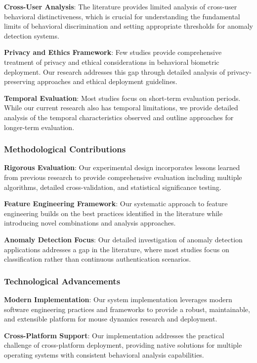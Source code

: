 \documentclass[
  12pt,
  a4paper,
]{report}
\begin{document}
\textbf{Cross-User Analysis}: The literature provides limited analysis
of cross-user behavioral distinctiveness, which is crucial for
understanding the fundamental limits of behavioral discrimination and
setting appropriate thresholds for anomaly detection systems.

\textbf{Privacy and Ethics Framework}: Few studies provide comprehensive
treatment of privacy and ethical considerations in behavioral biometric
deployment. Our research addresses this gap through detailed analysis of
privacy-preserving approaches and ethical deployment guidelines.

\textbf{Temporal Evaluation}: Most studies focus on short-term
evaluation periods. While our current research also has temporal
limitations, we provide detailed analysis of the temporal
characteristics observed and outline approaches for longer-term
evaluation.

\subsubsection{Methodological
Contributions}\label{methodological-contributions}

\textbf{Rigorous Evaluation}: Our experimental design incorporates
lessons learned from previous research to provide comprehensive
evaluation including multiple algorithms, detailed cross-validation, and
statistical significance testing.

\textbf{Feature Engineering Framework}: Our systematic approach to
feature engineering builds on the best practices identified in the
literature while introducing novel combinations and analysis approaches.

\textbf{Anomaly Detection Focus}: Our detailed investigation of anomaly
detection applications addresses a gap in the literature, where most
studies focus on classification rather than continuous authentication
scenarios.

\subsubsection{Technological
Advancements}\label{technological-advancements}

\textbf{Modern Implementation}: Our system implementation leverages
modern software engineering practices and frameworks to provide a
robust, maintainable, and extensible platform for mouse dynamics
research and deployment.

\textbf{Cross-Platform Support}: Our implementation addresses the
practical challenge of cross-platform deployment, providing native
solutions for multiple operating systems with consistent behavioral
analysis capabilities.
\end{document}
